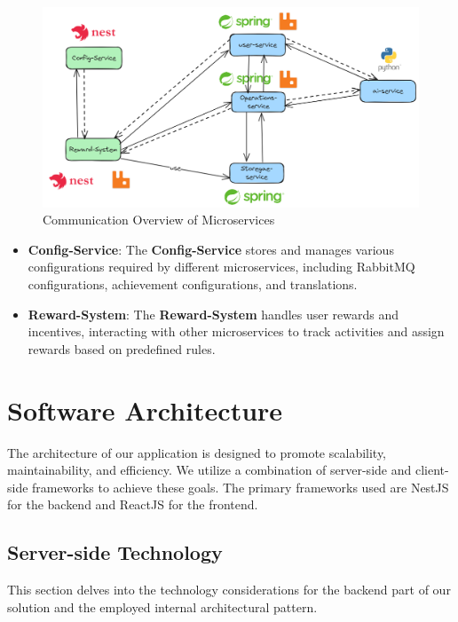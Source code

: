 \begin{figure}[h]
    \centering
    \includegraphics[width=1\textwidth]{src/assets/diagrams/microservicesComm.png}
    \caption{Communication Overview of Microservices}
    \label{fig:microservices}
\end{figure}

\begin{itemize}
    \item \textbf{Config-Service}: The \textbf{Config-Service} stores and manages various configurations required by different microservices, including RabbitMQ configurations, achievement configurations, and translations.
    
    \item \textbf{Reward-System}: The \textbf{Reward-System} handles user rewards and incentives, interacting with other microservices to track activities and assign rewards based on predefined rules.
\end{itemize}

\section{Software Architecture}

The architecture of our application is designed to promote scalability, maintainability, and efficiency. We utilize a combination of server-side and client-side frameworks to achieve these goals. The primary frameworks used are NestJS for the backend and ReactJS for the frontend.

\subsection{Server-side Technology}
This section delves into the technology considerations for the backend part of our solution and the employed internal architectural pattern.

